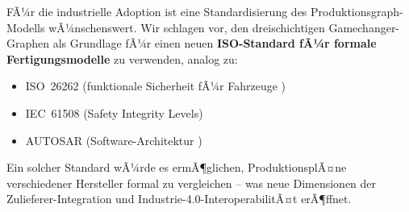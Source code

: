 ﻿\documentclass[a4paper,12pt]{article}
\theoremstyle{definition}
\begin{document}
FÃ¼r die industrielle Adoption ist eine Standardisierung des Produktionsgraph-Modells
wÃ¼nschenswert. Wir schlagen vor, den dreischichtigen Gamechanger-Graphen als Grundlage
fÃ¼r einen neuen \textbf{ISO-Standard fÃ¼r formale Fertigungsmodelle} zu verwenden, analog zu:
\begin{itemize}
\item ISO~26262 (funktionale Sicherheit fÃ¼r Fahrzeuge \cite{iso26262})
\item IEC~61508 (Safety Integrity Levels)
\item AUTOSAR (Software-Architektur \cite{autosar2023})
\end{itemize}
Ein solcher Standard wÃ¼rde es ermÃ¶glichen, ProduktionsplÃ¤ne verschiedener Hersteller
formal zu vergleichen -- was neue Dimensionen der Zulieferer-Integration und
Industrie-4.0-InteroperabilitÃ¤t erÃ¶ffnet.

\end{document}
